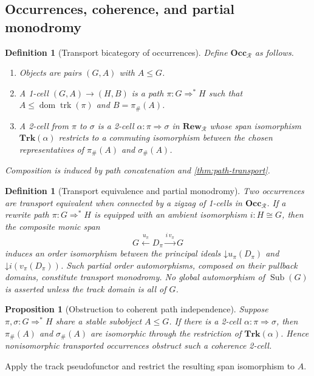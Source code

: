 \documentclass[12pt,a4paper,twoside]{extarticle}
\makeatletter
\theoremstyle{compactplain}
\newtheorem{proposition}[theorem]{Proposition}
\theoremstyle{compactdef}
\newtheorem{definition}[theorem]{Definition}
\renewenvironment{proof}[1][\proofname]{\par\pushQED{\qed}\normalfont
  \topsep2pt\trivlist\item[\hskip\labelsep\bfseries #1\@addpunct{.}]\ignorespaces}
 {\popQED\endtrivlist\@endpefalse}
\newcommand{\Sub}{\operatorname{Sub}}
\newcommand{\dom}{\operatorname{dom}}
\newcommand{\trk}{\operatorname{trk}}
\newcommand{\down}{\mathord{\downarrow}}
\newcommand{\iso}{\cong}
\makeatother
\begin{document}
\subsection{Occurrences, coherence, and partial monodromy}
\begin{definition}[Transport bicategory of occurrences]
Define $\mathbf{Occ}_{\mathcal R}$ as follows.
\begin{enumerate}
\item Objects are pairs $(G,A)$ with $A\le G$.
\item A 1-cell $(G,A)\to(H,B)$ is a path $\pi:G\Rightarrow^*H$ such that $A\le\dom\trk(\pi)$ and $B=\pi_{\#}(A)$.
\item A 2-cell from $\pi$ to $\sigma$ is a 2-cell $\alpha:\pi\Rightarrow\sigma$ in $\mathbf{Rew}_{\mathcal R}$ whose span isomorphism $\mathbf{Trk}(\alpha)$ restricts to a commuting isomorphism between the chosen representatives of $\pi_{\#}(A)$ and $\sigma_{\#}(A)$.
\end{enumerate}
Composition is induced by path concatenation and \cref{thm:path-transport}.
\end{definition}

\begin{definition}[Transport equivalence and partial monodromy]
Two occurrences are transport equivalent when connected by a zigzag of 1-cells in $\mathbf{Occ}_{\mathcal R}$. If a rewrite path $\pi:G\Rightarrow^*H$ is equipped with an ambient isomorphism $i:H\iso G$, then the composite monic span
\[
G\xleftarrow{u_\pi}D_\pi\xrightarrow{i\,v_\pi}G
\]
induces an order isomorphism between the principal ideals $\down u_\pi(D_\pi)$ and $\down i(v_\pi(D_\pi))$. Such partial order automorphisms, composed on their pullback domains, constitute \emph{transport monodromy}. No global automorphism of $\Sub(G)$ is asserted unless the track domain is all of $G$.
\end{definition}

\begin{proposition}[Obstruction to coherent path independence]
Suppose $\pi,\sigma:G\Rightarrow^*H$ share a stable subobject $A\le G$. If there is a 2-cell $\alpha:\pi\Rightarrow\sigma$, then $\pi_{\#}(A)$ and $\sigma_{\#}(A)$ are isomorphic through the restriction of $\mathbf{Trk}(\alpha)$. Hence nonisomorphic transported occurrences obstruct such a coherence 2-cell.
\end{proposition}
\begin{proof}
Apply the track pseudofunctor and restrict the resulting span isomorphism to $A$.
\end{proof}
\end{document}

